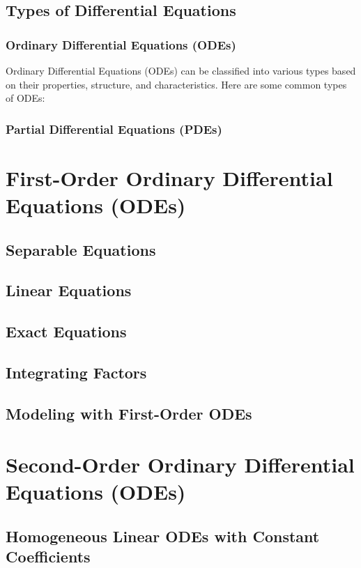 \documentclass[11pt]{article}
\begin{document}
		\subsection{Types of Differential Equations}
			\subsubsection{Ordinary Differential Equations (ODEs)}
				Ordinary Differential Equations (ODEs) can be classified into various types based on their
				properties, structure, and characteristics. Here are some common types of ODEs:
			\subsubsection{Partial Differential Equations (PDEs)}
				\lipsum[1]
	\section{First-Order Ordinary Differential Equations (ODEs)}
		\lipsum[1]
		\subsection{Separable Equations}
			\lipsum[1]
		\subsection{Linear Equations}
			\lipsum[1]
		\subsection{Exact Equations}
			\lipsum[1]
		\subsection{Integrating Factors}
			\lipsum[1]
		\subsection{Modeling with First-Order ODEs}
			\lipsum[1]
	\section{Second-Order Ordinary Differential Equations (ODEs)}
		\lipsum[1]
		\subsection{Homogeneous Linear ODEs with Constant Coefficients}
			\lipsum[1]
\end{document}
